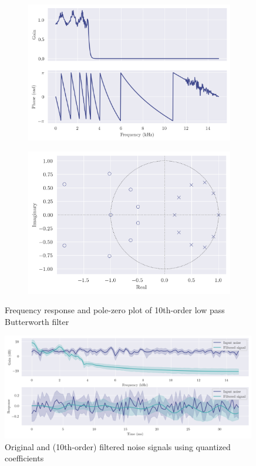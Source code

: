 \begin{figure}[ht]
    \centering
    \begin{subfigure}[b]{0.51\textwidth}
        \centering
        \includegraphics[width=\textwidth]{images/q8_q10th_freqz.png}
    \end{subfigure}
    \hfill
    \begin{subfigure}[b]{0.48\textwidth}
        \centering
        \includegraphics[width=\textwidth]{images/q8_q10th_zp.png}
    \end{subfigure}
    \caption{Frequency response and pole-zero plot of 10th-order low pass Butterworth filter}
\end{figure}

\begin{figure}[!ht]
    \centering
    \includegraphics[width=0.99\textwidth]{images/q8_q10th_stability.png}
    \caption{Original and (10th-order) filtered noise signals using quantized coefficients}
\end{figure}

